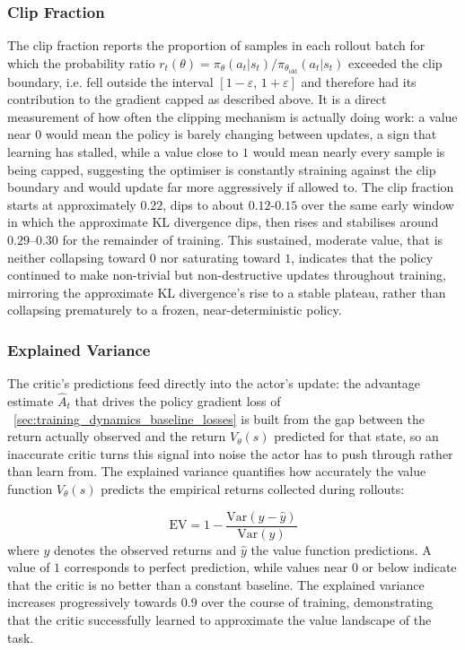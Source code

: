 \subsubsection{Clip Fraction}
The clip fraction reports the proportion of samples in each rollout batch for which the probability ratio $r_t(\theta) = \pi_\theta(a_t | s_t) / \pi_{\theta_\mathrm{old}}(a_t|s_t)$ exceeded the clip boundary, i.e. fell outside the interval $[1 - \varepsilon,\,1 + \varepsilon]$ and therefore had its contribution to the gradient capped as described above. It is a direct measurement of how often the clipping mechanism is actually doing work: a value near $0$ would mean the policy is barely changing between updates, a sign that learning has stalled, while a value close to $1$ would mean nearly every sample is being capped, suggesting the optimiser is constantly straining against the clip boundary and would update far more aggressively if allowed to. The clip fraction starts at approximately $0.22$, dips to about $0.12$-$0.15$ over the same early window in which the approximate KL divergence dips, then rises and stabilises around $0.29$--$0.30$ for the remainder of training. This sustained, moderate value, that is neither collapsing toward $0$ nor saturating toward $1$, indicates that the policy continued to make non-trivial but non-destructive updates throughout training, mirroring the approximate KL divergence's rise to a stable plateau, rather than collapsing prematurely to a frozen, near-deterministic policy.

\subsubsection{Explained Variance}
The critic's predictions feed directly into the actor's update: the advantage estimate $\hat{A}_t$ that drives the policy gradient loss of \subsectionname~\ref{sec:training_dynamics_baseline_losses} is built from the gap between the return actually observed and the return $V_\theta(s)$ predicted for that state, so an inaccurate critic turns this signal into noise the actor has to push through rather than learn from. The explained variance quantifies how accurately the value function $V_\theta(s)$ predicts the empirical returns collected during rollouts:

\begin{equation}
    \mathrm{EV} = 1 - \frac{\mathrm{Var}(y - \hat{y})}{\mathrm{Var}(y)}
\end{equation}
where $y$ denotes the observed returns and $\hat{y}$ the value function predictions. A value of $1$ corresponds to perfect prediction, while values near $0$ or below indicate that the critic is no better than a constant baseline. The explained variance increases progressively towards $0.9$ over the course of training, demonstrating that the critic successfully learned to approximate the value landscape of the task.

